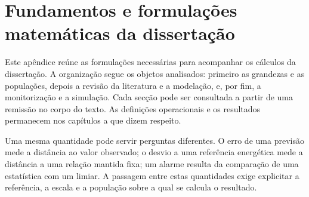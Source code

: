 \chapter{Fundamentos e formulações matemáticas da dissertação}
\label{app:matematica}

Este apêndice reúne as formulações necessárias para acompanhar os cálculos da dissertação. A organização segue os objetos analisados: primeiro as grandezas e as populações, depois a revisão da literatura e a modelação, e, por fim, a monitorização e a simulação. Cada secção pode ser consultada a partir de uma remissão no corpo do texto. As definições operacionais e os resultados permanecem nos capítulos a que dizem respeito.

Uma mesma quantidade pode servir perguntas diferentes. O erro de uma previsão mede a distância ao valor observado; o desvio a uma referência energética mede a distância a uma relação mantida fixa; um alarme resulta da comparação de uma estatística com um limiar. A passagem entre estas quantidades exige explicitar a referência, a escala e a população sobre a qual se calcula o resultado.


